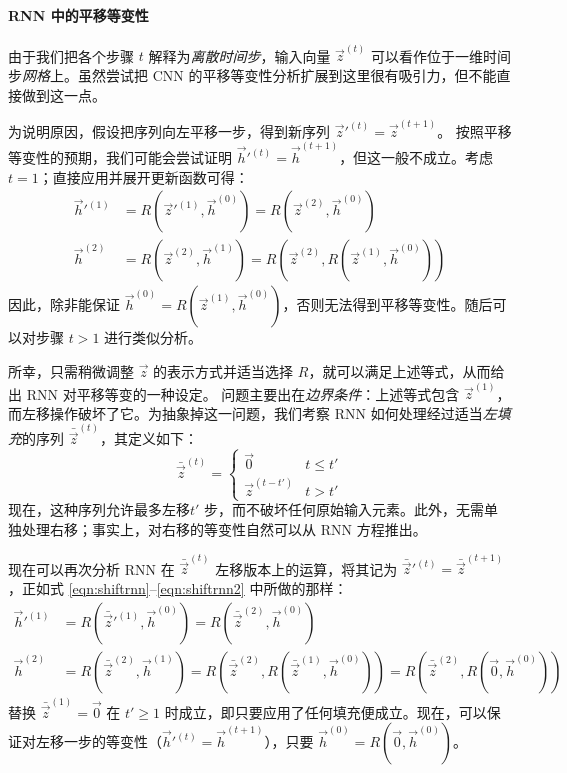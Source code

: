 \paragraph{RNN 中的平移等变性}由于我们把各个步骤 $t$ 解释为\emph{离散时间步}，输入向量 $\vec{z}^{(t)}$ 可以看作位于一维时间步\emph{网格}上。虽然尝试把 CNN 的平移等变性分析扩展到这里很有吸引力，但不能直接做到这一点。

为说明原因，假设把序列向左平移一步，得到新序列 $\vec{z}'^{(t)} = \vec{z}^{(t+1)}$。%
按照平移等变性的预期，我们可能会尝试证明 $\vec{h}'^{(t)} = \vec{h}^{(t+1)}$，但这一般不成立。考虑 $t = 1$；直接应用并展开更新函数可得：
\begin{align}\label{eqn:shiftrnn}
    \vec{h}'^{(1)} &= R(\vec{z}'^{(1)}, \vec{h}^{(0)}) = R(\vec{z}^{(2)}, \vec{h}^{(0)})\\ 
    \vec{h}^{(2)} &= R(\vec{z}^{(2)}, \vec{h}^{(1)}) = R(\vec{z}^{(2)}, R(\vec{z}^{(1)}, \vec{h}^{(0)}))\label{eqn:shiftrnn2} 
\end{align}
因此，除非能保证 $\vec{h}^{(0)} = R(\vec{z}^{(1)}, \vec{h}^{(0)})$，否则无法得到平移等变性。随后可以对步骤 $t > 1$ 进行类似分析。

所幸，只需稍微调整 $\vec{z}$ 的表示方式并适当选择 $R$，就可以满足上述等式，从而给出 RNN 对平移等变的一种设定。
%
问题主要出在\emph{边界条件}：上述等式包含 $\vec{z}^{(1)}$，而左移操作破坏了它。为抽象掉这一问题，我们考察 RNN 如何处理经过适当\emph{左填充}的序列 $\bar{\vec{z}}^{(t)}$，其定义如下：
$$
    \bar{\vec{z}}^{(t)} = \begin{cases}
        \vec{0} & t \leq t'\\
        \vec{z}^{(t - t')} & t > t' 
    \end{cases}
$$
现在，这种序列允许最多左移$t'$ 步，而不破坏任何原始输入元素。此外，无需单独处理右移；事实上，对右移的等变性自然可以从 RNN 方程推出。

现在可以再次分析 RNN 在 $\bar{\vec{z}}^{(t)}$ 左移版本上的运算，将其记为 $\bar{\vec{z}}'^{(t)} = \bar{\vec{z}}^{(t+1)}$，正如式 \ref{eqn:shiftrnn}--\ref{eqn:shiftrnn2} 中所做的那样：
\begin{align*}
    \vec{h}'^{(1)} &= R(\bar{\vec{z}}'^{(1)}, \vec{h}^{(0)}) = R(\bar{\vec{z}}^{(2)}, \vec{h}^{(0)})\\ \vec{h}^{(2)} &= R(\bar{\vec{z}}^{(2)}, \vec{h}^{(1)}) = R(\bar{\vec{z}}^{(2)}, R(\bar{\vec{z}}^{(1)}, \vec{h}^{(0)})) = R(\bar{\vec{z}}^{(2)}, R(\vec{0}, \vec{h}^{(0)}))
\end{align*}
替换 $\bar{\vec{z}}^{(1)} = \vec{0}$ 在 $t' \geq 1$ 时成立，即只要应用了任何填充便成立。现在，可以保证对左移一步的等变性（$\vec{h}'^{(t)} = \vec{h}^{(t+1)}$），只要 $\vec{h}^{(0)} = R(\vec{0}, \vec{h}^{(0)})$。


